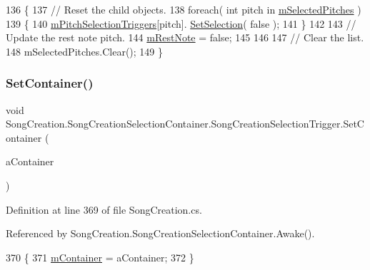 \begin{DoxyCode}
136         \{
137             \textcolor{comment}{// Reset the child objects.}
138             \textcolor{keywordflow}{foreach}( \textcolor{keywordtype}{int} pitch \textcolor{keywordflow}{in} \hyperlink{group___s_c_handlers_ga816236cbae1f13ea34be94fb1b86b7cd}{mSelectedPitches} )
139             \{
140                 \hyperlink{group___s_c_handlers_ga1affedf973b4aa39505b35053c12df7e}{mPitchSelectionTriggers}[pitch].
      \hyperlink{group___s_c_handlers_ga0eebfa085bd5326ed4cb4981cf02d2e0}{SetSelection}( \textcolor{keyword}{false} );
141             \}
142 
143             \textcolor{comment}{// Update the rest note pitch.}
144             \hyperlink{group___s_c_handlers_gace289a908db9ba443c50ec8656ae05b1}{mRestNote} = \textcolor{keyword}{false};
145 
146 
147             \textcolor{comment}{// Clear the list.}
148             mSelectedPitches.Clear();
149         \}
\end{DoxyCode}
\mbox{\label{group___s_c_handlers_gaa9ae3234792bb4a0ee0cb16d00563130}} 
\subsubsection{\texorpdfstring{Set\+Container()}{SetContainer()}}
{\footnotesize\ttfamily void Song\+Creation.\+Song\+Creation\+Selection\+Container.\+Song\+Creation\+Selection\+Trigger.\+Set\+Container (\begin{DoxyParamCaption}\item[{\hyperlink{class_song_creation_1_1_song_creation_selection_container}{Song\+Creation\+Selection\+Container}}]{a\+Container }\end{DoxyParamCaption})}



Definition at line 369 of file Song\+Creation.\+cs.



Referenced by Song\+Creation.\+Song\+Creation\+Selection\+Container.\+Awake().


\begin{DoxyCode}
370             \{
371                 \hyperlink{group___s_c_handlers_ga23a094f17b949a4ea153f66c73e42578}{mContainer} = aContainer;
372             \}
\end{DoxyCode}
\mbox{\label{group___s_c_handlers_ga963bc1a13bdd44643cf814aa4976f3d0}} 
